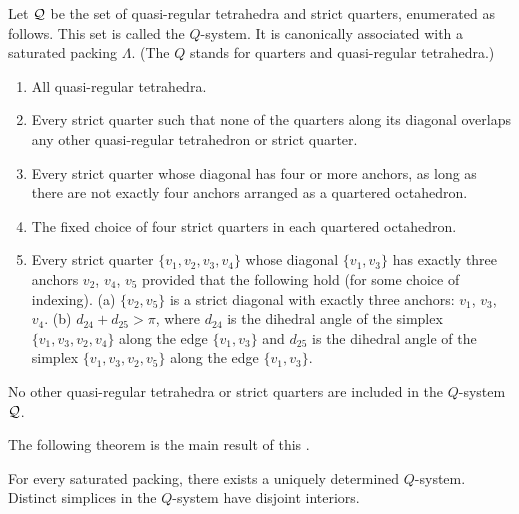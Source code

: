 \begin{definition}\label{def:q-system}
Let ${\mathcal Q}$ be the set of quasi-regular tetrahedra and strict
quarters, enumerated as follows. This set is called the
$Q$-system.  It is canonically associated with a saturated packing
$\Lambda$.  (The $Q$ stands for quarters and quasi-regular
tetrahedra.)
%


\begin{enumerate}
   \item All quasi-regular tetrahedra.
   \item Every strict quarter such that none of the quarters along
   its diagonal overlaps any other
   quasi-regular tetrahedron or strict quarter.
   \item Every strict quarter whose diagonal has four or more
   anchors, as long as there are not exactly four anchors arranged
   as a quartered
   octahedron.
   \item The fixed choice of four strict quarters in each
   quartered octahedron.
   \item Every strict quarter $\{v_1,v_2,v_3,v_4\}$ whose diagonal
      $\{v_1,v_3\}$ has exactly three anchors $v_2$, $v_4$, $v_5$ provided that
      the following hold (for some choice of indexing).
      (a) $\{v_2,v_5\}$ is a strict diagonal
      with exactly three anchors: $v_1$, $v_3$, $v_4$.
      (b) $d_{24}+d_{25}>\pi$, where $d_{24}$ is the dihedral angle
       of the simplex $\{v_1,v_3,v_2,v_4\}$ along the edge $\{v_1,v_3\}$
       and $d_{25}$ is the dihedral angle of the simplex
       $\{v_1,v_3,v_2,v_5\}$ along the edge $\{v_1,v_3\}$.
\end{enumerate}
No other quasi-regular tetrahedra or strict quarters are included
in the $Q$-system ${\mathcal Q}$.
\end{definition}


The following theorem is the main result of this \chap.

\begin{theorem}\label{thm:nonoverlap}
For every saturated packing, there exists a uniquely determined
$Q$-system.  Distinct simplices in the $Q$-system have disjoint
interiors.
\end{theorem}

